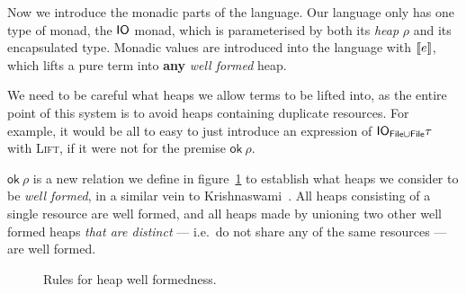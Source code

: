 Now we introduce the monadic parts of the language. Our language only
has one type of monad, the $\IO$ monad, which is parameterised by both
its \emph{heap} $\rho$ and its encapsulated type. Monadic values are
introduced into the language with $\lift{e}$, which lifts a pure term into
\textbf{any} \emph{well formed} heap. 
\begin{mathpar}
\end{mathpar}
We need to be careful what heaps we allow terms to be lifted into, as
the entire point of this system is to avoid heaps containing duplicate
resources. For example, it would be all to easy to just introduce an
expression of $\IO_{\textsf{File} \cup \textsf{File}} \tau$ with
\textsc{Lift}, if it were not for the premise $\textsf{ok} \ \rho$.

$\textsf{ok} \ \rho$ is a new relation we define in
figure~\ref{fig:heapwellformedness} to establish what heaps we
consider to be \textit{well formed}, in a similar vein to
Krishnaswami~\cite{krishnaswami2006}. All heaps consisting of a single
resource are well formed, and all heaps made by unioning two other well
formed heaps \textit{that are distinct} --- i.e.\ do not share any of the
same resources --- are well formed.
\begin{figure}
  \centering
  \caption{Rules for heap well formedness.}\label{fig:heapwellformedness}
\end{figure}

